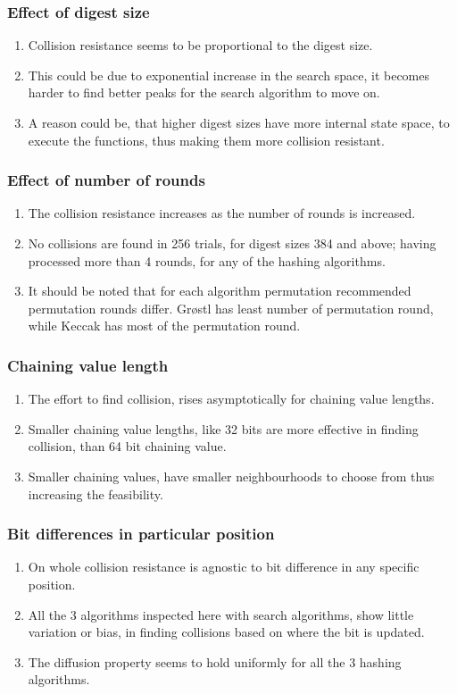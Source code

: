 \documentclass{beamer}
\begin{document}
\begin{frame}
\frametitle{Effect of digest size}
\begin{enumerate}
\item Collision resistance seems to be proportional to the digest size.
\item This could be due to exponential increase in the search space, it becomes harder to find better peaks
for the search algorithm to move on.
\item A reason could be, that higher digest sizes have more internal state space, to execute the functions,
thus making them more collision resistant.
\end{enumerate}
\end{frame}

\begin{frame}
\frametitle{Effect of number of rounds}
\begin{enumerate}
\item The collision resistance increases as the number of rounds is increased.
\item No collisions are found in 256 trials, for digest sizes 384 and above; having processed more than 4
rounds, for any of the hashing algorithms.
\item It should be noted that for each algorithm permutation recommended permutation rounds differ. Gr{\o}stl
has least number of permutation round, while Keccak has most of the permutation round.
\end{enumerate}
\end{frame}

\begin{frame}
\frametitle{Chaining value length}
\begin{enumerate}
\item The effort to find collision, rises asymptotically for chaining value lengths.
\item Smaller chaining value lengths, like 32 bits are more effective in finding collision, than 64 bit
chaining value.
\item Smaller chaining values, have smaller neighbourhoods to choose from thus increasing the feasibility.
\end{enumerate}
\end{frame}

\begin{frame}
\frametitle{Bit differences in particular position}
\begin{enumerate}
\item On whole collision resistance is agnostic to bit difference in any specific position.
\item All the 3 algorithms inspected here with search algorithms, show little variation or bias, in finding
collisions based on where the bit is updated.
\item The diffusion property seems to hold uniformly for all the 3 hashing algorithms.
\end{enumerate}
\end{frame}
\end{document}
